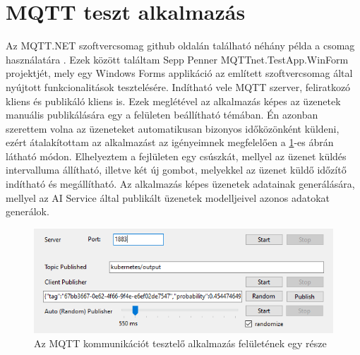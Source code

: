 \section{MQTT teszt alkalmazás}
Az MQTT.NET szoftvercsomag github oldalán található néhány példa a csomag használatára \cite{mqttnet-examples}.
Ezek között találtam Sepp Penner MQTTnet.TestApp.WinForm \cite{mqttnet-winforms} projektjét, 
mely egy Windows Forms applikáció az említett szoftvercsomag által nyújtott funkcionalitások tesztelésére.
Indítható vele MQTT szerver, feliratkozó kliens és publikáló kliens is.
Ezek meglétével az alkalmazás képes az üzenetek manuális publikálására egy a felületen beállítható témában.
Én azonban szerettem volna az üzeneteket automatikusan bizonyos időközönként küldeni,
ezért átalakítottam az alkalmazást az igényeimnek megfelelően a \ref{fig:mqtt-tester}-es ábrán látható módon.
Elhelyeztem a fejlületen egy csúszkát, mellyel az üzenet küldés intervalluma állítható, illetve két új gombot,
melyekkel az üzenet küldő időzítő indítható és megállítható.
Az alkalmazás képes üzenetek adatainak generálására, mellyel az AI Service által publikált üzenetek modelljeivel azonos adatokat generálok.
\begin{figure}[!ht]
    \centering
    \includegraphics[width=150mm, keepaspectratio]{figures/MQTT-Tester.png}
    \caption{Az MQTT kommunikációt tesztelő alkalmazás felületének egy része}
    \label{fig:mqtt-tester}
\end{figure}

